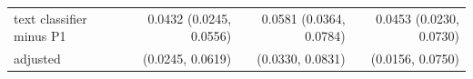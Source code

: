 \begin{tabular}{lrrr}
text classifier minus P1 & 0.0432 (0.0245, 0.0556) & 0.0581 (0.0364, 0.0784) & 0.0453 (0.0230, 0.0730) \\
\quad adjusted & (0.0245, 0.0619) & (0.0330, 0.0831) & (0.0156, 0.0750) \\

\end{tabular}
